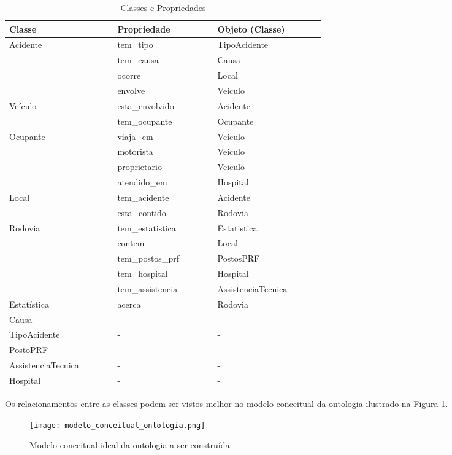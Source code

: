 	  \begin{table*}[!h]
	  \centering
	  \begin{tabular}{p{0.2\linewidth}p{0.20\linewidth}p{0.20\linewidth}}
	    \hline
	    \textbf{Classe} & \textbf{Propriedade} & \textbf{Objeto (Classe)}\\
	    \hline
	      Acidente & tem\_tipo & TipoAcidente\\
		& tem\_causa & Causa\\
		& ocorre & Local\\
		& envolve & Veiculo\\
	    \hline
	      Veículo & esta\_envolvido & Acidente\\
		& tem\_ocupante & Ocupante\\
	    \hline
	      Ocupante & viaja\_em & Veiculo\\
		& motorista & Veiculo\\
		& proprietario & Veiculo\\
		& atendido\_em & Hospital\\
	    \hline
	      Local & tem\_acidente & Acidente\\
		& esta\_contido & Rodovia\\
	    \hline
	      Rodovia & tem\_estatistica & Estatistica\\
		& contem & Local\\
		& tem\_postos\_prf & PostosPRF\\
		& tem\_hospital & Hospital\\
		& tem\_assistencia & AssistenciaTecnica\\
	    \hline
	      Estatística & acerca & Rodovia\\
	    \hline
	      Causa & - & -\\
	    \hline
	      TipoAcidente & - & -\\
	    \hline
	      PostoPRF & - & -\\
	    \hline
	      AssistenciaTecnica & - & -\\
	    \hline
	      Hospital & - & -\\
	    \hline
	  \end{tabular}
	  \caption{Classes e Propriedades}
	  \label{tab:classes}
	  \end{table*}
	  
	  Os relacionamentos entre as classes podem ser vistos melhor no modelo conceitual da ontologia ilustrado na
	  Figura \ref{fig:modelo_conceitual_ontologia}.
	  
	  \vfill
	  \pagebreak
	  \begin{figure}[!h]
	    \centering
	    \texttt{[image: modelo\_conceitual\_ontologia.png]}
	    \caption[Modelo conceitual ideal da ontologia]{Modelo conceitual ideal da ontologia a ser construída}
	    \label{fig:modelo_conceitual_ontologia}
	  \end{figure}
	  
